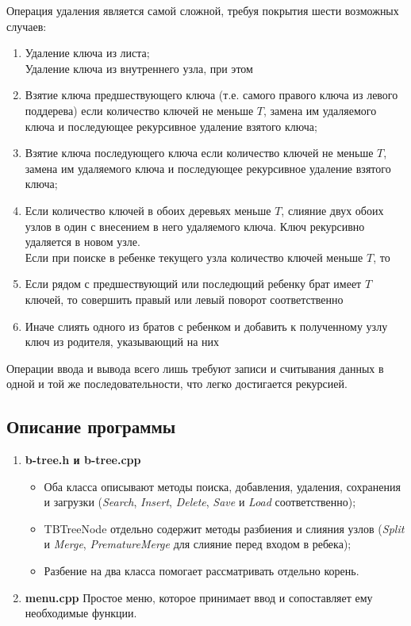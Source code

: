 \documentclass[12pt]{article}
\begin{document}
Операция удаления является самой сложной, требуя покрытия шести возможных случаев:
\begin{enumerate}
\item Удаление ключа из листа;\\

Удаление ключа из внутреннего узла, при этом
\item Взятие ключа предшествующего ключа (т.е. самого правого ключа из левого поддерева) если количество ключей не меньше $T$, замена им удаляемого ключа и последующее рекурсивное удаление взятого ключа;
\item Взятие ключа последующего ключа если количество ключей не меньше $T$, замена им удаляемого ключа и последующее рекурсивное удаление взятого ключа;
\item Если количество ключей в обоих деревьях меньше $T$, слияние двух обоих узлов в один с внесением в него удаляемого ключа. Ключ рекурсивно удаляется в новом узле.\\

Если при поиске в ребенке текущего узла количество ключей меньше $T$, то
\item Если рядом с предшествующий или последющий ребенку брат имеет $T$ ключей, то совершить правый или левый поворот соответственно
\item Иначе слиять одного из братов с ребенком и добавить к полученному узлу ключ из родителя, указывающий на них
\end{enumerate}

Операции ввода и вывода всего лишь требуют записи и считывания данных в одной и той же последовательности, что легко достигается рекурсией.

\subsection*{Описание программы}

\begin{enumerate}
\item \textbf{b-tree.h и b-tree.cpp}
	\begin{itemize}
	Описывает классы TBTree для дерева и TBTreeNode для узлов
		\item Оба класса описывают методы поиска, добавления, удаления, сохранения и загрузки (\textit{Search}, \textit{Insert}, \textit{Delete}, \textit{Save} и \textit{Load} соответственно);
		\item TBTreeNode отдельно содержит методы разбиения и слияния узлов (\textit{Split} и \textit{Merge}, \textit{PrematureMerge} для слияние перед входом в ребека);
		\item Разбение на два класса помогает рассматривать отдельно корень.
	\end{itemize}
\item \textbf{menu.cpp}
Простое меню, которое принимает ввод и сопоставляет ему необходимые функции. 
\end{enumerate}
\end{document}
